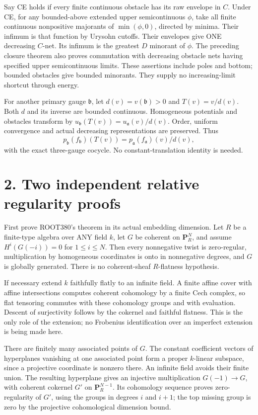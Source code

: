 \documentclass[11pt]{article}
\begin{document}
Say CE holds if every finite continuous obstacle has its raw envelope in \(C\). Under CE, for any bounded-above extended upper semicontinuous \(\phi\), take all finite continuous nonpositive majorants of \(\min(\phi,0)\), directed by minima. Their infimum is that function by Urysohn cutoffs. Their envelopes give ONE decreasing \(C\)-net. Its infimum is the greatest \(D\) minorant of \(\phi\). The preceding closure theorem also proves commutation with decreasing obstacle nets having specified upper semicontinuous limits. These assertions include poles and bottom; bounded obstacles give bounded minorants. They supply no increasing-limit shortcut through energy.

For another primary gauge \(\mathfrak b\), let \(d(v)=v(\mathfrak b)>0\) and \(T(v)=v/d(v)\). Both \(d\) and its inverse are bounded continuous. Homogeneous potentials and obstacles transform by \(u_{\mathfrak b}(T(v))=u_{\mathfrak a}(v)/d(v)\). Order, uniform convergence and actual decreasing representations are preserved. Thus
\[
p_{\mathfrak b}(f_{\mathfrak b})(T(v))=p_{\mathfrak a}(f_{\mathfrak a})(v)/d(v),
\]
with the exact three-gauge cocycle. No constant-translation identity is needed.

\section{2. Two independent relative regularity proofs}

First prove ROOT380's theorem in its actual embedding dimension. Let \(R\) be a finite-type algebra over ANY field \(k\), let \(G\) be coherent on \(\mathbf P^N_R\), and assume \(H^i(G(-i))=0\) for \(1\le i\le N\). Then every nonnegative twist is zero-regular, multiplication by homogeneous coordinates is onto in nonnegative degrees, and \(G\) is globally generated. There is no coherent-sheaf \(R\)-flatness hypothesis.

If necessary extend \(k\) faithfully flatly to an infinite field. A finite affine cover with affine intersections computes coherent cohomology by a finite Cech complex, so flat tensoring commutes with these cohomology groups and with evaluation. Descent of surjectivity follows by the cokernel and faithful flatness. This is the only role of the extension; no Frobenius identification over an imperfect extension is being made here.

There are finitely many associated points of \(G\). The constant coefficient vectors of hyperplanes vanishing at one associated point form a proper \(k\)-linear subspace, since a projective coordinate is nonzero there. An infinite field avoids their finite union. The resulting hyperplane gives an injective multiplication \(G(-1)\to G\), with coherent cokernel \(G'\) on \(\mathbf P^{N-1}_R\). Its cohomology sequence proves zero-regularity of \(G'\), using the groups in degrees \(i\) and \(i+1\); the top missing group is zero by the projective cohomological dimension bound.
\end{document}
